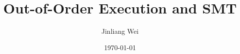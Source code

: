 \documentclass{beamer}
\begin{document}
\title{Out-of-Order Execution and SMT} 
\author{Jinliang Wei} 
\date{\today} 

\frame{\titlepage} 

\end{document}
